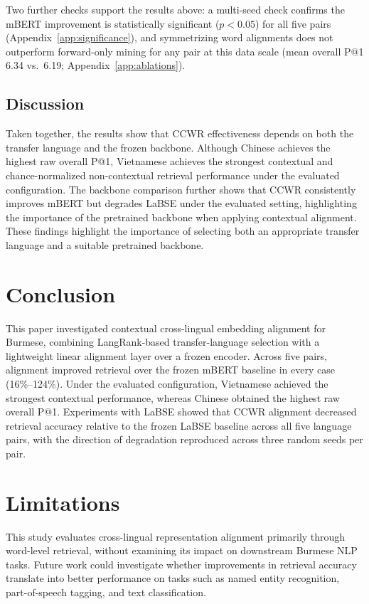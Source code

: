 \documentclass[11pt]{article}
\begin{document}
Two further checks support the results above: a multi-seed check confirms the mBERT improvement is statistically significant ($p<0.05$) for all five pairs (Appendix~\ref{app:significance}), and symmetrizing word alignments does not outperform forward-only mining for any pair at this data scale (mean overall P@1 6.34 vs.\ 6.19; Appendix~\ref{app:ablations}).

\subsection{Discussion}
\label{sec:discussion}

Taken together, the results show that CCWR effectiveness depends on
both the transfer language and the frozen backbone. Although Chinese
achieves the highest raw overall P@1, Vietnamese achieves the strongest contextual and chance-normalized non-contextual retrieval performance under the evaluated configuration. The backbone comparison further shows that CCWR consistently improves
mBERT but degrades LaBSE under the evaluated setting, highlighting the
importance of the pretrained backbone when applying contextual alignment. These findings highlight the importance of selecting both an appropriate transfer language and a suitable pretrained backbone.

\section{Conclusion}
\label{sec:conclusion}

This paper investigated contextual cross-lingual embedding alignment for Burmese, combining LangRank-based transfer-language selection with a lightweight linear alignment layer over a frozen encoder. Across five pairs, alignment improved retrieval over the frozen mBERT baseline in every case (16\%--124\%). Under the evaluated configuration, Vietnamese achieved the strongest contextual performance, whereas Chinese obtained the highest raw overall P@1. Experiments with LaBSE showed that CCWR alignment decreased retrieval accuracy relative to the frozen LaBSE baseline across all five language pairs, with the direction of degradation reproduced across three random seeds per pair.

\section{Limitations}
\label{sec:limitations}

This study evaluates cross-lingual representation
alignment primarily through word-level retrieval,
without examining its impact on downstream Burmese
NLP tasks. Future work could investigate whether
improvements in retrieval accuracy translate into
better performance on tasks such as named entity
recognition, part-of-speech tagging, and text
classification.
\end{document}
